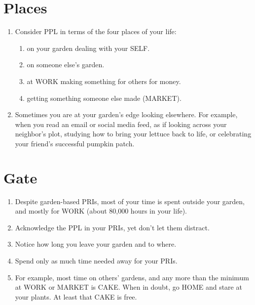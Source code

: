 \documentclass[
]{book}
\providecommand{\tightlist}{%
  \setlength{\itemsep}{0pt}\setlength{\parskip}{0pt}}
\begin{document}
\hypertarget{places}{%
\section{Places}\label{places}}

\begin{enumerate}
\def\labelenumi{\arabic{enumi}.}
\setcounter{enumi}{2}
\tightlist
\item
  Consider PPL in terms of the four places of your life:

  \begin{enumerate}
  \def\labelenumii{\arabic{enumii}.}
  \tightlist
  \item
    on your garden dealing with your SELF.
  \item
    on someone else's garden.
  \item
    at WORK making something for others for money.
  \item
    getting something someone else made (MARKET).
  \end{enumerate}
\item
  Sometimes you are at your garden's edge
  looking elsewhere.
  For example, when you read an email or social media feed,
  as if looking across your neighbor's plot,
  studying how to bring your lettuce back to life,
  or celebrating your friend's successful pumpkin patch.
\end{enumerate}

\hypertarget{gate}{%
\section{Gate}\label{gate}}

\begin{enumerate}
\def\labelenumi{\arabic{enumi}.}
\setcounter{enumi}{4}
\tightlist
\item
  Despite garden-based PRIs, most of your time
  is spent outside your garden, and mostly for WORK (about 80,000 hours in your life).
\item
  Acknowledge the PPL in your PRIs, yet don't let them distract.
\item
  Notice how long you leave your garden and to where.
\item
  Spend only as much time needed away for your PRIs.
\item
  For example, most time on others' gardens, and any more than the minimum at WORK or MARKET is CAKE. When in doubt, go HOME and stare at your plants. At least that CAKE is free.
\end{enumerate}
\end{document}
